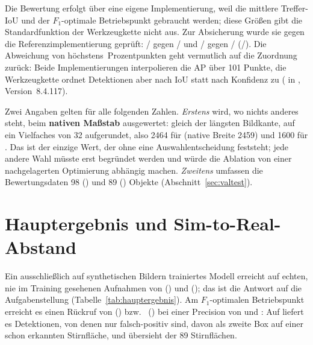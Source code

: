 Die Bewertung erfolgt über eine eigene Implementierung, weil die mittlere
Treffer-IoU und der $F_1$-optimale Betriebspunkt gebraucht werden; diese
Größen gibt die Standardfunktion der Werkzeugkette nicht aus. Zur Absicherung
wurde sie gegen die Referenzimplementierung geprüft: 
\zxcValEigen/\zxcValEigenA{} gegen \zxcValUlt/\zxcValUltA{} und 
\zxcTestEigen/\zxcTestEigenA{} gegen \zxcTestUlt/\zxcTestUltA{}
(\mAPfifty{}/\mAPall{}). Die Abweichung von höchstens \zxcMaxDiff\,Prozentpunkten
geht vermutlich auf die Zuordnung zurück: Beide Implementierungen interpolieren
die AP über 101 Punkte, die Werkzeugkette ordnet Detektionen aber nach IoU statt
nach Konfidenz zu ( in
, Version~8.4.117).

Zwei Angaben gelten für alle folgenden Zahlen. \emph{Erstens} wird, wo nichts
anderes steht, beim \textbf{nativen Maßstab} ausgewertet:  gleich
der längsten Bildkante, auf ein Vielfaches von 32 aufgerundet, also 2464 für
 (native Breite 2459\px) und 1600 für . Das ist der
einzige Wert, der ohne eine Auswahlentscheidung feststeht; jede andere Wahl
müsste erst begründet werden und würde die Ablation von einer nachgelagerten
Optimierung abhängig machen. \emph{Zweitens} umfassen die Bewertungsdaten
98 () und 89 () Objekte (Abschnitt~\ref{sec:valtest}).

\section{Hauptergebnis und Sim-to-Real-Abstand}
\label{sec:hauptergebnis}



Ein ausschließlich auf synthetischen Bildern trainiertes Modell erreicht auf
echten, nie im Training gesehenen Aufnahmen \mAPfifty{} von
\textbf{\zrefValMap} () und \textbf{\zrefTestMap} (); das
ist die Antwort auf die Aufgabenstellung (Tabelle~\ref{tab:hauptergebnis}). Am
$F_1$-optimalen Betriebspunkt erreicht es einen Rückruf von \zrefValRec{}
() bzw.\ \zrefTestRec{} () bei einer Precision von
\zrefValPrec{} und \zrefTestPrec: Auf  liefert es \znPredTest{}
Detektionen, von denen nur \zfpTest{} falsch-positiv sind, \zfpDoppelTest{} davon
als zweite Box auf einer schon erkannten Stirnfläche, und übersieht \zfnTest{}
der 89 Stirnflächen.

